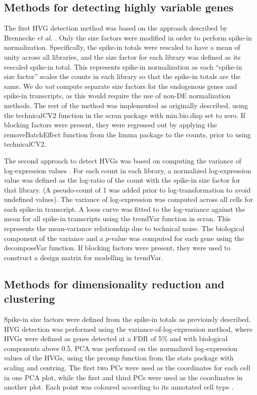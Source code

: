 \documentclass{article}
\begin{document}
\subsection{Methods for detecting highly variable genes}
The first HVG detection method was based on the approach described by Brennecke \textit{et al.} \cite{brennecke2013accounting}.
Only the size factors were modified in order to perform spike-in normalization.
Specifically, the spike-in totals were rescaled to have a mean of unity across all libraries, and the size factor for each library was defined as its rescaled spike-in total.
This represents spike-in normalization as each ``spike-in size factor'' scales the counts in each library so that the spike-in totals are the same. 
We do \textit{not} compute separate size factors for the endogenous genes and spike-in transcripts, as this would require the use of non-DE normalization methods.
The rest of the method was implemented as originally described, using the technicalCV2 function in the scran package with min.bio.disp set to zero.
If blocking factors were present, they were regressed out by applying the removeBatchEffect function from the limma package to the counts, prior to using technicalCV2.

The second approach to detect HVGs was based on computing the variance of log-expression values \cite{lun2016stepbystep}.
For each count in each library, a normalized log-expression value was defined as the log-ratio of the count with the spike-in size factor for that library.
(A pseudo-count of 1 was added prior to log-transformation to avoid undefined values).
The variance of log-expression was computed across all cells for each spike-in transcript.
A loess curve was fitted to the log-variance against the mean for all spike-in transcripts using the trendVar function in scran.
This represents the mean-variance relationship due to technical noise.
The biological component of the variance and a $p$-value was computed for each gene using the decomposeVar function.
If blocking factors were present, they were used to construct a design matrix for modelling in trendVar.

\subsection{Methods for dimensionality reduction and clustering}
Spike-in size factors were defined from the spike-in totals as previously described. 
HVG detection was performed using the variance-of-log-expression method, where HVGs were defined as genes detected at a FDR of 5\% and with biological components above 0.5.
PCA was performed on the normalized log-expression values of the HVGs, using the prcomp function from the stats package with scaling and centring.
The first two PCs were used as the coordinates for each cell in one PCA plot, while the first and third PCs were used as the coordinates in another plot.
Each point was coloured according to its annotated cell type \cite{segerstople2016single}.
\end{document}
